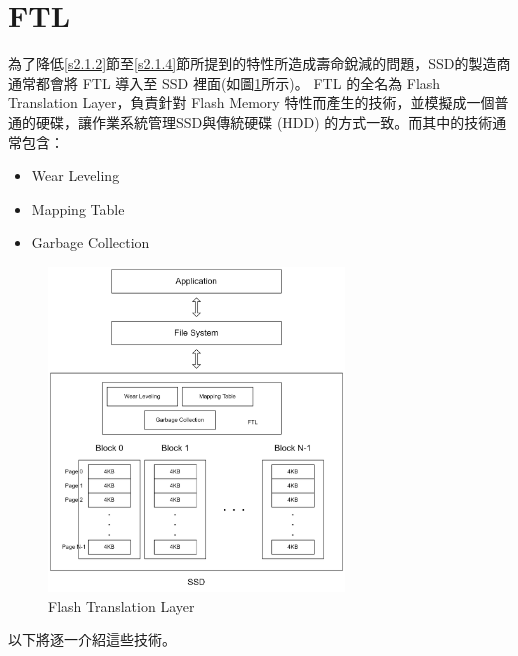 \section{FTL}\label{s2.2}
\indent
為了降低\ref{s2.1.2}節至\ref{s2.1.4}節所提到的特性所造成壽命銳減的問題，SSD的製造商通常都會將 FTL 導入至 SSD 裡面(如圖\ref{f2.4}所示)。
FTL 的全名為 Flash Translation Layer，負責針對 Flash Memory 特性而產生的技術，並模擬成一個普通的硬碟，讓作業系統管理SSD與傳統硬碟 (HDD) 的方式一致。而其中的技術通常包含：\cite{Boukhobza2014ASA}
\begin{itemize}
    \item Wear Leveling
    \item Mapping Table
    \item Garbage Collection
\end{itemize}
\begin{figure}[H]
    \centering
    \includegraphics[width=0.7\textwidth]{picture/ch2/FTL.png}
    \caption{Flash Translation Layer}
    \label{f2.4}
\end{figure}
以下將逐一介紹這些技術。

